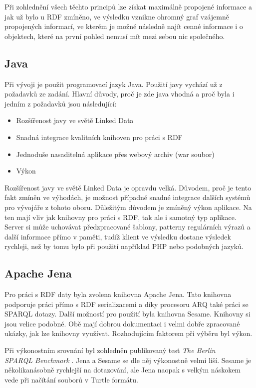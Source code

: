 \documentclass[thesis=B,czech]{FITthesis}[2012/06/26]
\begin{document}
  Při zohlednění všech těchto principů lze získat maximálně propojené informace a jak už bylo u RDF zmíněno, ve výsledku vznikne ohromný graf vzájemně
  propojených informací, ve kterém je možné následně najít cenné informace i o objektech, které na první pohled nemusí mít mezi sebou nic společného.

  
  \subsection{Java}
   Při vývoji je použit programovací jazyk Java. Použití javy vychází už z požadavků ze zadání. Hlavní důvody, proč je zde java vhodná a proč byla
   i jedním z požadavků jsou následující:
   \begin{itemize}
    \item Rozšířenost javy ve světě Linked Data
    \item Snadná integrace kvalitních knihoven pro práci s RDF
    \item Jednoduše nasaditelná aplikace přes webový archiv (war soubor)
    \item Výkon
   \end{itemize}
   Rozšířenost javy ve světě Linked Data je opravdu velká. Důvodem, proč je tento fakt zmíněn ve výhodách, je možnost případné snadné integrace dalších systémů
   pro vývojáře z tohoto oboru. Důležitým důvodem je zmíněný výkon aplikace. Na ten mají vliv jak knihovny pro práci s RDF, tak ale i samotný typ aplikace.
   Server si může uchovávat předzpracované šablony, patterny regulárních výrazů a další informace přímo v paměti, tudíž klient ve výsledku dostane výsledek rychleji,
   než by tomu bylo při použití například PHP nebo podobných jazyků.
   
   \subsection{Apache Jena}
   Pro práci s RDF daty byla zvolena knihovna Apache Jena. Tato knihovna podporuje práci přímo s RDF serializacemi a díky procesoru ARQ také práci se SPARQL
   dotazy. Další možností pro použití byla knihovna Sesame. Knihovny si jsou velice podobné. Obě mají dobrou dokumentaci i velmi dobře zpracované 
   ukázky, jak lze knihovny využívat. Rozhodujícím faktorem při výběru byl výkon.
   
   Při výkonostním srovnání byl zohledněn publikovaný test \textit{The Berlin\\ SPARQL Benchmark} \cite{sparql_benchmark}.
   Jena a Sesame se dle něj výkonostně velmi liší. Sesame je několikanásobně rychlejší na dotazování, ale Jena naopak s velkým náskokem vede při načítání souborů
   v Turtle formátu.
   
\end{document}
